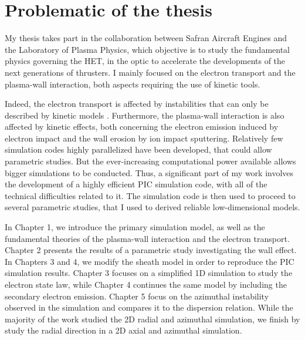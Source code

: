
\section*{Problematic of the thesis}
\label{sec-problematic}

My thesis takes part in the collaboration between Safran Aircraft Engines and the Laboratory of Plasma Physics, which objective is to study the fundamental physics governing the \ac{HET}, in the optic to accelerate the developments of the next generations of thrusters.
I mainly focused on the electron transport and the plasma-wall interaction,
both aspects requiring the use of kinetic tools.

Indeed, the electron transport is affected by instabilities that can only be described by kinetic models \citep{adam2008a,lafleur2016a}.
Furthermore, the plasma-wall interaction is also affected by kinetic effects, both concerning the electron emission induced by electron impact \citep{barral2003a,raitses2011,sydorenko2006} and the wall erosion by ion impact sputtering.
Relatively few simulation codes highly parallelized have been developed, that could allow parametric studies.
But the ever-increasing computational power available allows bigger simulations to be conducted.
Thus, a significant part of my work involves the development of a highly efficient \ac{PIC} simulation code, with all of the technical difficulties related to it.
The simulation code is then used to proceed to several parametric studies, that I used to derived reliable low-dimensional models.


\vspace{1em}
In Chapter 1, we introduce the primary simulation model, as well as the fundamental theories of the plasma-wall interaction and the electron transport.
Chapter 2 presents the results of a parametric study investigating the wall effect.
In Chapters 3 and 4, we modify the sheath model in order to reproduce the \ac{PIC} simulation results.
Chapter 3 focuses on a simplified \ac{1D} simulation to study the electron state law, while Chapter 4 continues the same model by including the secondary electron emission.
Chapter 5 focus on the azimuthal instability observed in the simulation and compares it to the dispersion relation.
While the majority of the work studied the \ac{2D} radial and azimuthal simulation, we finish by study the radial direction in a \ac{2D} axial and azimuthal simulation.